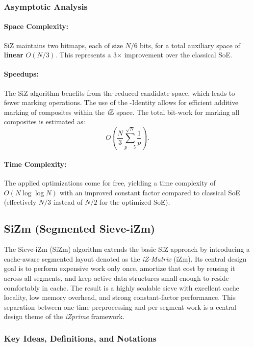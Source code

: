 \documentclass{article}
\begin{document}
\subsubsection*{Asymptotic Analysis}

\paragraph{Space Complexity:} SiZ maintains two bitmaps, each of size $N/6$ bits, for a total auxiliary space of \textbf{linear} $O(N/3)$. This represents a 3× improvement over the classical SoE.

\paragraph{Speedups:} The SiZ algorithm benefits from the reduced candidate space, which leads to fewer marking operations. The use of the \Xp-Identity allows for efficient additive marking of composites within the $\textit{i}\mathbb{Z}$ space. The total bit-work for marking all composites is estimated as:
\[
O\left(\frac{N}{3}\sum_{p=5}^{\sqrt N}\frac{1}{p}\right).
\]
\paragraph{Time Complexity:} The applied optimizations come for free, yielding a time complexity of $O(N \log \log N)$ with an improved constant factor compared to classical SoE (effectively $N/3$ instead of $N/2$ for the optimized SoE).

\subsection{SiZm (Segmented Sieve-iZm)} \label{alg:sizm}

The Sieve-iZm (SiZm) algorithm extends the basic SiZ approach by introducing a cache-aware segmented layout denoted as the \emph{iZ-Matrix} (iZm). Its central design goal is to perform expensive work only once, amortize that cost by reusing it across all segments, and keep active data structures small enough to reside comfortably in cache. The result is a highly scalable sieve with excellent cache locality, low memory overhead, and strong constant-factor performance.
This separation between one-time preprocessing and per-segment work is a central design theme of the \emph{iZprime} framework.

\subsubsection*{Key Ideas, Definitions, and Notations}
\end{document}
